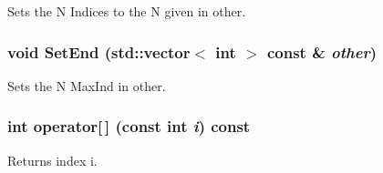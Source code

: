 Sets the N Indices to the N given in other. \hypertarget{classJKBuilder_1_1Iterator_aad84ec668b5f41210db34c540aaa31fc}{
\subsubsection[{SetEnd}]{\setlength{\rightskip}{0pt plus 5cm}void SetEnd (std::vector$<$ int $>$ const \& {\em other})}}
\label{classJKBuilder_1_1Iterator_aad84ec668b5f41210db34c540aaa31fc}


Sets the N MaxInd in other. \hypertarget{classJKBuilder_1_1Iterator_a74247cf730a06b23fcb1ec64e5596b25}{
\subsubsection[{operator[]}]{\setlength{\rightskip}{0pt plus 5cm}int operator\mbox{[}$\,$\mbox{]} (const int {\em i}) const}}
\label{classJKBuilder_1_1Iterator_a74247cf730a06b23fcb1ec64e5596b25}


Returns index i. 

